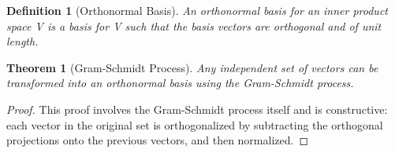 \documentclass{article}
\newtheorem{definition}{Definition}[section]
\newtheorem{theorem}{Theorem}[section]
\begin{document}
\begin{definition}[Orthonormal Basis]
An orthonormal basis for an inner product space V is a basis for V such that the basis vectors are orthogonal and of unit length.
\end{definition}

\begin{theorem}[Gram-Schmidt Process]
Any independent set of vectors can be transformed into an orthonormal basis using the Gram-Schmidt process.
\end{theorem}

\begin{proof}
This proof involves the Gram-Schmidt process itself and is constructive: each vector in the original set is orthogonalized by subtracting the orthogonal projections onto the previous vectors, and then normalized.
\end{proof}
\end{document}
